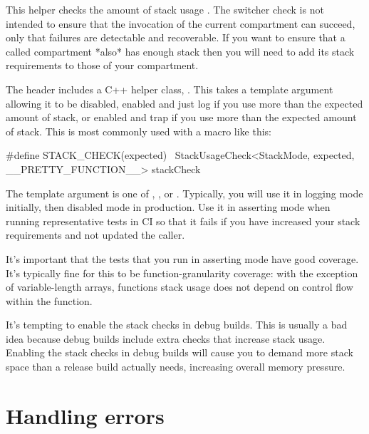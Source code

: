 
\begin{note}
This helper checks the amount of stack usage .
The switcher check is not intended to ensure that the invocation of the current compartment can succeed, only that failures are detectable and recoverable.
If you want to ensure that a called compartment *also* has enough stack then you will need to add its stack requirements to those of your compartment.
\end{note}

The  header includes a C++ helper class, .
This takes a template argument allowing it to be disabled, enabled and just log if you use more than the expected amount of stack, or enabled and trap if you use more than the expected amount of stack.
This is most commonly used with a macro like this:

\begin{cxxsnippet}
#define STACK_CHECK(expected) \ 
       StackUsageCheck<StackMode, expected, __PRETTY_FUNCTION__> stackCheck
\end{cxxsnippet}

The  template argument is one of , , or .
Typically, you will use it in logging mode initially, then disabled mode in production.
Use it in asserting mode when running representative tests in CI so that it fails if you have increased your stack requirements and not updated the caller.

It's important that the tests that you run in asserting mode have good coverage.
It's typically fine for this to be function-granularity coverage: with the exception of variable-length arrays, functions stack usage does not depend on control flow within the function.

\begin{caution}
It's tempting to enable the stack checks in debug builds.
This is usually a bad idea because debug builds include extra checks that increase stack usage.
Enabling the stack checks in debug builds will cause you to demand more stack space than a release build actually needs, increasing overall memory pressure.
\end{caution}

\section[label=handling_errors]{Handling errors}

